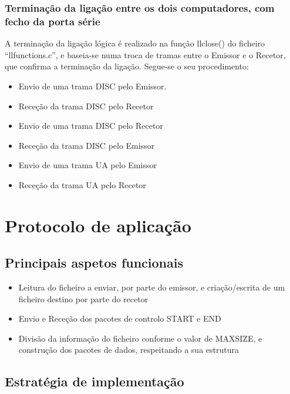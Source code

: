 \documentclass[article, a4paper, 11pt, oneside]{memoir}
\begin{document}
 \subsection{Terminação da ligação entre os dois computadores, com fecho da porta série}
A terminação da ligação lógica é realizado na função llclose() do ficheiro “llfunctions.c”, e baseia-se numa troca de tramas entre o Emissor e o Recetor, que confirma a terminação da ligação. 
Segue-se o seu procedimento:
\begin{itemize}
	\item Envio de uma trama DISC pelo Emissor.
	\item Receção da trama DISC pelo Recetor
	\item Envio de uma trama DISC pelo Recetor
	\item Receção da trama DISC pelo Emissor
	\item Envio de uma trama UA pelo Emissor
	\item Receção da trama UA pelo Recetor
\end{itemize}


\chapter[Protocolo de aplicação][Protocolo de aplicação]{Protocolo de aplicação} \label{\thechapter}
  
\section{Principais aspetos funcionais}
\begin{itemize}
  \item Leitura do ficheiro a enviar, por parte do emissor, e criação/escrita de um ficheiro destino por parte do recetor
  \item Envio e Receção dos pacotes de controlo START e END
  \item Divisão da informação do ficheiro conforme o valor de MAX\textunderscore SIZE, e construção dos pacotes de dados, respeitando a sua estrutura
\end{itemize}

\section{Estratégia de implementação}
\end{document}

